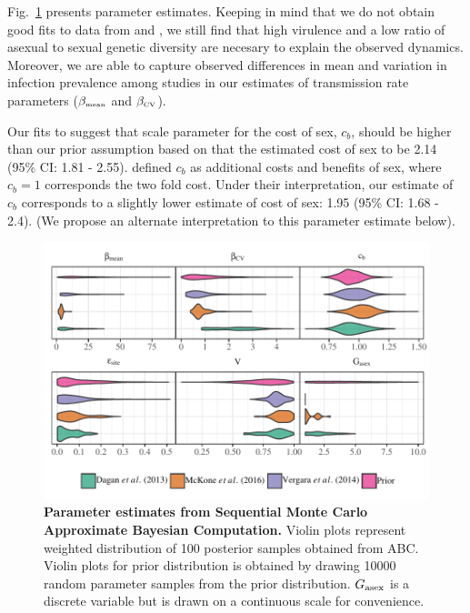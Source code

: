 \documentclass{article}\usepackage[]{graphicx}\usepackage[]{color}
\newcommand{\fref}[1]{Fig.~\ref{fig:#1}}
\begin{document}
\fref{smcparam} presents parameter estimates.
Keeping in mind that we do not obtain good fits to data from \cite{dagan2013clonal} and \cite{mckone2016fine}, we still find that high virulence and a low ratio of asexual to sexual genetic diversity are necesary to explain the observed dynamics.
Moreover, we are able to capture observed differences in mean and variation in infection prevalence among studies in our estimates of transmission rate parameters ($\beta_{\textrm{\tiny mean}}$ and $\beta_{\textrm{\tiny CV}}$).

Our fits to \cite{mckone2016fine} suggest that scale parameter for the cost of sex, $c_b$, should be higher than our prior assumption based on \cite{gibson2017two} that the estimated cost of sex to be 2.14 (95\% CI: 1.81 - 2.55).
\cite{ashby2015diversity} defined $c_b$ as additional costs and benefits of sex, where $c_b=1$ corresponds the two fold cost.
Under their interpretation, our estimate of $c_b$ corresponds to a slightly lower estimate of cost of sex: 1.95 (95\% CI: 1.68 - 2.4). 
(We propose an alternate interpretation to this parameter estimate below).

\begin{figure}[!ht]
\includegraphics[width=\textwidth]{../fig/posterior.pdf}
\caption{{\bf Parameter estimates from Sequential Monte Carlo Approximate Bayesian Computation.}
Violin plots represent weighted distribution of 100 posterior samples obtained from ABC.
Violin plots for prior distribution is obtained by drawing 10000 random parameter samples from the prior distribution.
$G_{\tiny \textrm{asex}}$ is a discrete variable but is drawn on a continuous scale for convenience.
}
\label{fig:smcparam}
\end{figure}
\end{document}
